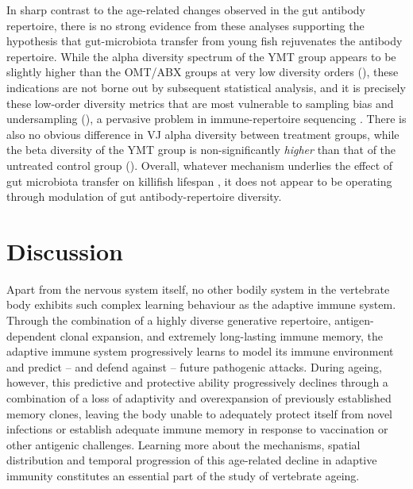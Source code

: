 In sharp contrast to the age-related changes observed in the gut antibody repertoire, there is no strong evidence from these analyses supporting the hypothesis that gut-microbiota transfer from young fish rejuvenates the antibody repertoire. While the alpha diversity spectrum of the YMT group appears to be slightly higher than the OMT/ABX groups at very low diversity orders (), these indications are not borne out by subsequent statistical analysis, and it is precisely these low-order diversity metrics that are most vulnerable to sampling bias and undersampling (), a pervasive problem in immune-repertoire sequencing \parencite{mora2016diversity}. There is also no obvious difference in VJ alpha diversity between treatment groups, while the beta diversity of the YMT group is non-significantly \textit{higher} than that of the untreated control group (). Overall, whatever mechanism underlies the effect of gut microbiota transfer on killifish lifespan \parencite{smith2017microbiota}, it does not appear to be operating through modulation of gut antibody-repertoire diversity.

\section{Discussion}
\label{sec:igseq_discussion}

Apart from the nervous system itself, no other bodily system in the vertebrate body exhibits such complex learning behaviour as the adaptive immune system. Through the combination of a highly diverse generative repertoire, antigen-dependent clonal expansion, and extremely long-lasting immune memory, the adaptive immune system progressively learns to model its immune environment and predict -- and defend against -- future pathogenic attacks. During ageing, however, this predictive and protective ability progressively declines through a combination of a loss of adaptivity and overexpansion of previously established memory clones, leaving the body unable to adequately protect itself from novel infections or establish adequate immune memory in response to vaccination or other antigenic challenges. Learning more about the mechanisms, spatial distribution and temporal progression of this age-related decline in adaptive immunity constitutes an essential part of the study of vertebrate ageing. %

